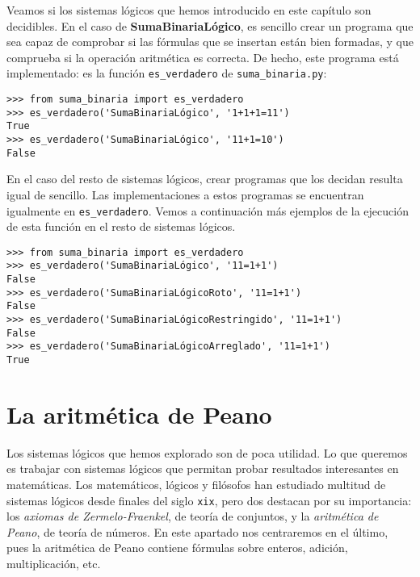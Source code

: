 Veamos si los sistemas lógicos que hemos introducido en este capítulo son decidibles. En el caso de \textbf{SumaBinariaLógico}, es sencillo crear un programa que sea capaz de comprobar si las fórmulas que se insertan están bien formadas, y que comprueba si la operación aritmética es correcta. De hecho, este programa está implementado: es la función \texttt{es\_verdadero} de \texttt{suma\_binaria.py}:
\begin{lstlisting}[numbers=none,frame=none]
>>> from suma_binaria import es_verdadero
>>> es_verdadero('SumaBinariaLógico', '1+1+1=11')
True
>>> es_verdadero('SumaBinariaLógico', '11+1=10')
False
\end{lstlisting}

En el caso del resto de sistemas lógicos, crear programas que los decidan resulta igual de sencillo. Las implementaciones a estos programas se encuentran igualmente en \texttt{es\_verdadero}. Vemos a continuación más ejemplos de la ejecución de esta función en el resto de sistemas lógicos.
\begin{lstlisting}[numbers=none,frame=none]
>>> from suma_binaria import es_verdadero
>>> es_verdadero('SumaBinariaLógico', '11=1+1')
False
>>> es_verdadero('SumaBinariaLógicoRoto', '11=1+1')
False
>>> es_verdadero('SumaBinariaLógicoRestringido', '11=1+1')
False
>>> es_verdadero('SumaBinariaLógicoArreglado', '11=1+1')
True
\end{lstlisting}


\section{La aritmética de Peano}\label{sec:aritmetica-peano}

Los sistemas lógicos que hemos explorado son de poca utilidad. Lo que queremos es trabajar con sistemas lógicos que permitan probar resultados interesantes en matemáticas. Los matemáticos, lógicos y filósofos han estudiado multitud de sistemas lógicos desde finales del siglo \texttt{xix}, pero dos destacan por su importancia: los \emph{axiomas de Zermelo-Fraenkel}, de teoría de conjuntos, y la \emph{aritmética de Peano}, de teoría de números. En este apartado nos centraremos en el último, pues la aritmética de Peano contiene fórmulas sobre enteros, adición, multiplicación, etc.

